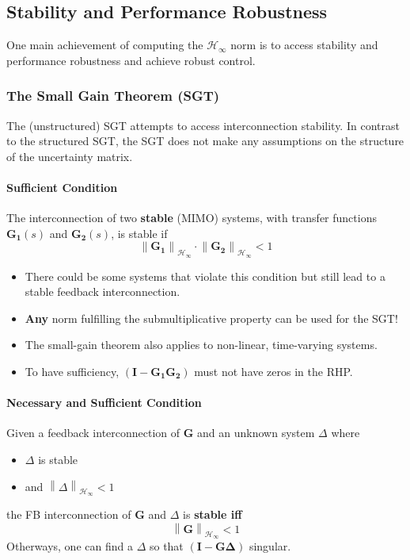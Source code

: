 \subsection{Stability and Performance Robustness}
One main achievement of computing the $\mathcal{H}_\infty$ norm is to access stability and performance robustness and achieve robust control.
\subsubsection{The Small Gain Theorem (SGT)}
The (unstructured) SGT attempts to access interconnection stability. In contrast to the structured SGT, the SGT does not make any assumptions on the structure of the uncertainty matrix.

\paragraph{Sufficient Condition}

The interconnection of two \textbf{stable} (MIMO) systems, with transfer functions $\mathbf{G_1}(s)$ and $\mathbf{G_2}(s)$, is stable if
\begin{equation*}
    \left\|\mathbf{G_1}\right\|_{\mathcal{H}_\infty}\cdot\left\|\mathbf{G_2}\right\|_{\mathcal{H}_\infty}<1
\end{equation*}

\begin{itemize}
    \item There could be some systems that violate this condition but still lead to a stable feedback interconnection.
    \item \textbf{Any} norm fulfilling the submultiplicative property can be used for the SGT!
    \item The small-gain theorem also applies to non-linear, time-varying systems.
    \item To have sufficiency, $(\mathbf{I}-\mathbf{G_1G_2})$ must not have zeros in the RHP.
\end{itemize}

\paragraph{Necessary and Sufficient Condition}
Given a feedback interconnection of $\mathbf{G}$ and an unknown system $\Delta$ where
\begin{itemize}
    \item $\Delta$ is stable
    \item and $\left\|\Delta\right\|_{\mathcal{H}_\infty}<1$
\end{itemize}
the FB interconnection of $\mathbf{G}$ and $\Delta$ is \textbf{stable iff}
\begin{equation*}
    \left\|\mathbf{G}\right\|_{\mathcal{H}_\infty}<1
\end{equation*}
Otherways, one can find a $\Delta$ so that $(\mathbf{I}-\mathbf{G\Delta})$ singular.\\

